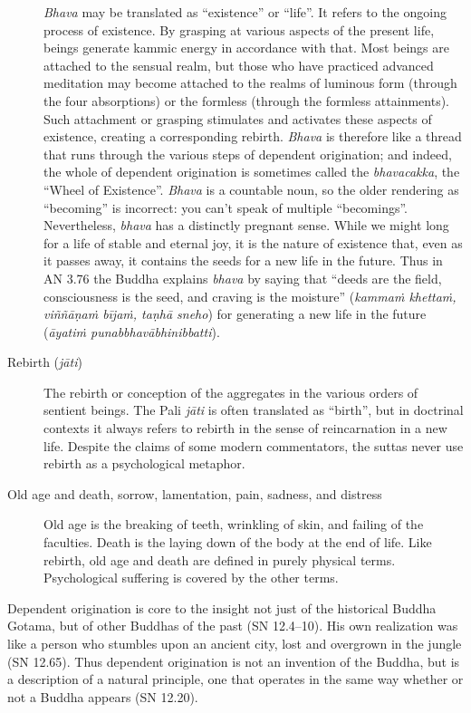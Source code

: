 \documentclass[12pt,openany]{book}%
\begin{document}
\begin{description}
\textit{Bhava} may be translated as “existence” or “life”. It refers to the ongoing process of existence. By grasping at various aspects of the present life, beings generate kammic energy in accordance with that. Most beings are attached to the sensual realm, but those who have practiced advanced meditation may become attached to the realms of luminous form (through the four absorptions) or the formless (through the formless attainments). Such attachment or grasping stimulates and activates these aspects of existence, creating a corresponding rebirth. \textit{Bhava} is therefore like a thread that runs through the various steps of dependent origination; and indeed, the whole of dependent origination is sometimes called the \textit{bhavacakka}, the “Wheel of Existence”. \textit{Bhava} is a countable noun, so the older rendering as “becoming” is incorrect: you can’t speak of multiple “becomings”. Nevertheless, \textit{bhava} has a distinctly pregnant sense. While we might long for a life of stable and eternal joy, it is the nature of existence that, even as it passes away, it contains the seeds for a new life in the future. Thus in AN 3.76 the Buddha explains \textit{bhava} by saying that “deeds are the field, consciousness is the seed, and craving is the moisture” (\textit{\textsanskrit{kammaṁ} \textsanskrit{khettaṁ}, \textsanskrit{viññāṇaṁ} \textsanskrit{bījaṁ}, \textsanskrit{taṇhā} sneho}) for generating a new life in the future (\textit{\textsanskrit{āyatiṁ} \textsanskrit{punabbhavābhinibbatti}}).%
\item[Rebirth (\textit{\textsanskrit{jāti}})] The rebirth or conception of the aggregates in the various orders of sentient beings.
The Pali \textit{\textsanskrit{jāti}} is often translated as “birth”, but in doctrinal contexts it always refers to rebirth in the sense of reincarnation in a new life. Despite the claims of some modern commentators, the suttas never use rebirth as a psychological metaphor.%
\item[Old age and death, sorrow, lamentation, pain, sadness, and distress] Old age is the breaking of teeth, wrinkling of skin, and failing of the faculties. Death is the laying down of the body at the end of life.
Like rebirth, old age and death are defined in purely physical terms. Psychological suffering is covered by the other terms.%
\end{description}

Dependent origination is core to the insight not just of the historical Buddha Gotama, but of other Buddhas of the past (SN 12.4–10). His own realization was like a person who stumbles upon an ancient city, lost and overgrown in the jungle (SN 12.65). Thus dependent origination is not an invention of the Buddha, but is a description of a natural principle, one that operates in the same way whether or not a Buddha appears (SN 12.20).
\end{document}
